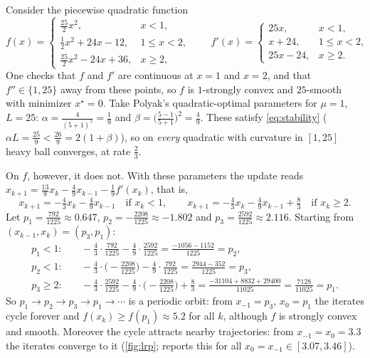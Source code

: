 \begin{example}\label{ex:lrp}
Consider the piecewise quadratic function
\[
  f(x)=\begin{cases}\frac{25}{2}x^2, & x<1,\\[2pt] \frac12x^2+24x-12, & 1\le x<2,\\[2pt]
  \frac{25}{2}x^2-24x+36, & x\ge2,\end{cases}
  \qquad
  f'(x)=\begin{cases}25x, & x<1,\\ x+24, & 1\le x<2,\\ 25x-24, & x\ge2.\end{cases}
\]
One checks that $f$ and $f'$ are continuous at $x=1$ and $x=2$, and that $f''\in\{1,25\}$
away from these points, so $f$ is $1$-strongly convex and $25$-smooth with minimizer
$x^\star=0$. Take Polyak's quadratic-optimal parameters for $\mu=1$, $L=25$:
$\alpha=\frac{4}{(5+1)^2}=\frac19$ and $\beta=\bigl(\frac{5-1}{5+1}\bigr)^2=\frac49$. These
satisfy \eqref{eq:stability} ($\alpha L=\frac{25}9<\frac{26}{9}=2(1+\beta)$), so on \emph{every}
quadratic with curvature in $[1,25]$ heavy ball converges, at rate $\frac23$.

On $f$, however, it does not. With these parameters the update reads
$x_{k+1}=\frac{13}9x_k-\frac49x_{k-1}-\frac19f'(x_k)$, that is,
\[
  x_{k+1}=-\tfrac43x_k-\tfrac49x_{k-1}\quad\text{if }x_k<1,\qquad
  x_{k+1}=-\tfrac43x_k-\tfrac49x_{k-1}+\tfrac83\quad\text{if }x_k\ge2 .
\]
Let $p_1=\frac{792}{1225}\approx0.647$, $p_2=-\frac{2208}{1225}\approx-1.802$ and
$p_3=\frac{2592}{1225}\approx2.116$. Starting from $(x_{k-1},x_k)=(p_3,p_1)$:
\begin{align*}
  p_1<1:&\quad -\tfrac43\cdot\tfrac{792}{1225}-\tfrac49\cdot\tfrac{2592}{1225}=\tfrac{-1056-1152}{1225}=p_2,\\
  p_2<1:&\quad -\tfrac43\cdot\bigl(-\tfrac{2208}{1225}\bigr)-\tfrac49\cdot\tfrac{792}{1225}=\tfrac{2944-352}{1225}=p_3,\\
  p_3\ge2:&\quad -\tfrac43\cdot\tfrac{2592}{1225}-\tfrac49\cdot\bigl(-\tfrac{2208}{1225}\bigr)+\tfrac83
           =\tfrac{-31104+8832+29400}{11025}=\tfrac{7128}{11025}=p_1 .
\end{align*}
So $p_1\to p_2\to p_3\to p_1\to\cdots$ is a periodic orbit: from $x_{-1}=p_3$, $x_0=p_1$ the
iterates cycle forever and $f(x_k)\ge f(p_1)\approx5.2$ for all $k$, although $f$ is
strongly convex and smooth. Moreover the cycle attracts nearby trajectories: from
$x_{-1}=x_0=3.3$ the iterates converge to it (\cref{fig:lrp}; \cite{lessard2016} reports
this for all $x_0=x_{-1}\in[3.07,3.46]$).
\end{example}

